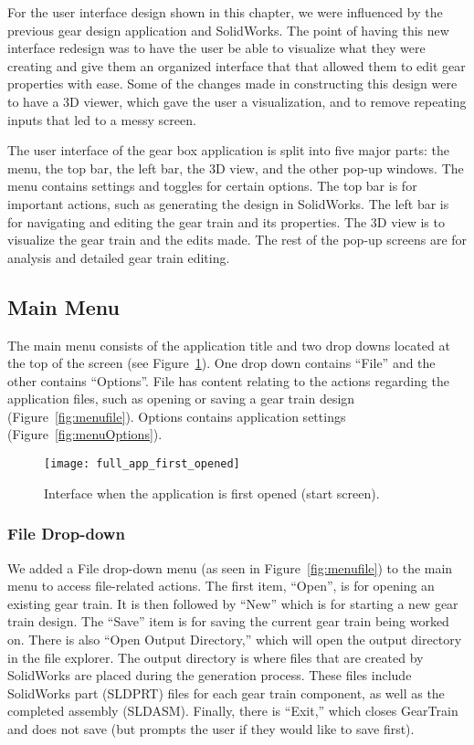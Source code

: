 \begin{doublespace}

For the user interface design shown in this chapter, we were influenced by the previous gear design application and SolidWorks. The point of having this new interface redesign was to have the user be able to visualize what they were creating and give them an organized interface that that allowed them to edit gear properties with ease. Some of the changes made in constructing this design were to have a 3D viewer, which gave the user a visualization, and to remove repeating inputs that led to a messy screen.

The user interface of the gear box application is split into five major parts: the menu, the top bar, the left bar, the 3D view, and the other pop-up windows. The menu contains settings and toggles for certain options. The top bar is for important actions, such as generating the design in SolidWorks. The left bar is for navigating and editing the gear train and its properties. The 3D view is to visualize the gear train and the edits made. The rest of the pop-up screens are for analysis and detailed gear train editing.

\subsection{Main Menu}

The main menu consists of the application title and two drop downs located at the top of the screen (see Figure~\ref{fig:firstopen}). One drop down contains ``File'' and the other contains ``Options''. File has content relating to the actions regarding the application files, such as opening or saving a gear train design (Figure~\ref{fig:menufile}). Options contains application settings (Figure~\ref{fig:menuOptions}).

\begin{figure}[htbp]
    \centering
    \texttt{[image: full\_app\_first\_opened]}
    \caption{Interface when the application is first opened (start screen).}
    \label{fig:firstopen}
\end{figure}

\subsubsection{File Drop-down}

We added a File drop-down menu (as seen in Figure~\ref{fig:menufile}) to the main menu to access file-related actions. The first item, ``Open'', is for opening an existing gear train. It is then followed by ``New'' which is for starting a new gear train design. The ``Save'' item is for saving the current gear train being worked on. There is also ``Open Output Directory,'' which will open the output directory in the file explorer. The output directory is where files that are created by SolidWorks are placed during the generation process. These files include SolidWorks part (SLDPRT) files for each gear train component, as well as the completed assembly (SLDASM). Finally, there is ``Exit,'' which closes GearTrain and does not save (but prompts the user if they would like to save first).


\end{doublespace}
